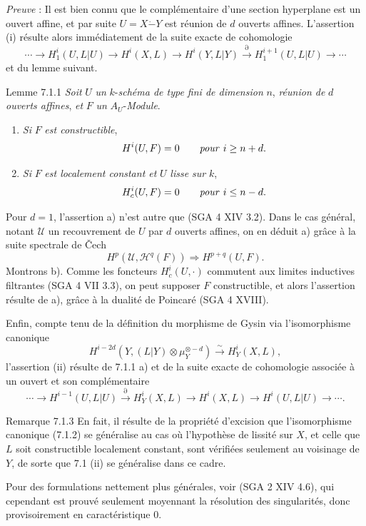 \emph{Preuve} : Il est bien connu que le complémentaire d'une section hyperplane est un ouvert affine, et par suite $U=X\mathbin{\dot{-}}Y$ est réunion de $d$ ouverts affines. L'assertion (i) résulte alors immédiatement de la suite exacte de cohomologie
\[
\cdots\to H_1^i(U,L|U)\to H^i(X,L)\to H^i(Y,L|Y)
\xrightarrow{\partial} H_1^{i+1}(U,L|U)\to\cdots
\]
et du lemme suivant.

\begin{statement}{Lemme 7.1.1}
\emph{Soit} $U$ \emph{un} $k$-\emph{schéma de type fini de dimension} $n$, \emph{réunion de} $d$ \emph{ouverts affines}, \emph{et} $F$ \emph{un} $A_U$-\emph{Module}.
\begin{enumerate}[label=\alph*)]
\item \emph{Si} $F$ \emph{est constructible},
\[
H^i(U,F)=0\qquad\text{\emph{pour} }i\ge n+d.
\]
\item \emph{Si} $F$ \emph{est localement constant et} $U$ \emph{lisse sur} $k$,
\[
H^i_c(U,F)=0\qquad\text{\emph{pour} }i\le n-d.
\]
\end{enumerate}
\end{statement}

Pour $d=1$, l'assertion a) n'est autre que (SGA 4 XIV 3.2). Dans le cas général, notant $\mathcal{U}$ un recouvrement de $U$ par $d$ ouverts affines, on en déduit a) grâce à la suite spectrale de Čech
\[
H^p(\mathcal{U},\mathcal{H}^q(F))\Rightarrow H^{p+q}(U,F).
\]
Montrons b). Comme les foncteurs $H_c^i(U,\cdot)$ commutent aux limites inductives filtrantes (SGA 4 VII 3.3), on peut supposer $F$ constructible, et alors l'assertion résulte de a), grâce à la dualité de Poincaré (SGA 4 XVIII).

Enfin, compte tenu de la définition du morphisme de Gysin via l'isomorphisme canonique
\[
H^{i-2d}(Y,(L|Y)\otimes\mu_Y^{\otimes -d})\xrightarrow{\sim} H^i_Y(X,L),
\tag{7.1.2}
\]
l'assertion (ii) résulte de 7.1.1 a) et de la suite exacte de cohomologie associée à un ouvert et son complémentaire
\[
\cdots\to H^{i-1}(U,L|U)\xrightarrow{\partial}H^i_Y(X,L)\to H^i(X,L)\to H^i(U,L|U)\to\cdots .
\]

\begin{statement}{Remarque 7.1.3}
En fait, il résulte de la propriété d'excision que l'isomorphisme canonique (7.1.2) se généralise au cas où l'hypothèse de lissité sur $X$, et celle que $L$ soit constructible localement constant, sont vérifiées seulement au voisinage de $Y$, de sorte que 7.1 (ii) se généralise dans ce cadre.

Pour des formulations nettement plus générales, voir (SGA 2 XIV 4.6), qui cependant est prouvé seulement moyennant la résolution des singularités, donc provisoirement en caractéristique $0$.
\end{statement}

